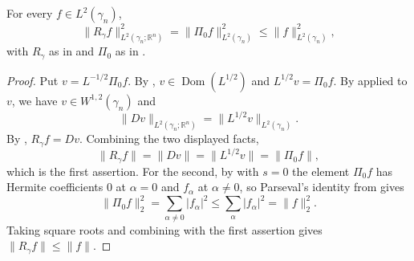 \begin{lemma}
For every $f \in L^2(\gamma_n)$,
\[
  \|R_\gamma f\|_{L^2(\gamma_n;\mathbb{R}^n)}^2 = \|\Pi_0 f\|_{L^2(\gamma_n)}^2
  \leq \|f\|_{L^2(\gamma_n)}^2 ,
\]
with $R_\gamma$ as in  and $\Pi_0$ as in
.
\end{lemma}
\begin{proof}
Put $v = L^{-1/2}\Pi_0 f$.  By ,
$v \in \operatorname{Dom}(L^{1/2})$ and $L^{1/2}v = \Pi_0 f$.  By
 applied to $v$, we have $v \in W^{1,2}(\gamma_n)$ and
\[
  \|Dv\|_{L^2(\gamma_n;\mathbb{R}^n)} = \|L^{1/2}v\|_{L^2(\gamma_n)} .
\]
By , $R_\gamma f = Dv$.  Combining the two displayed
facts,
\[
  \|R_\gamma f\| = \|Dv\| = \|L^{1/2}v\| = \|\Pi_0 f\| ,
\]
which is the first assertion.  For the second, by  with $s = 0$
the element $\Pi_0 f$ has Hermite coefficients $0$ at $\alpha = 0$ and $f_\alpha$
at $\alpha \neq 0$, so Parseval's identity from  gives
\[
  \|\Pi_0 f\|_2^2 = \sum_{\alpha \neq 0}|f_\alpha|^2
    \leq \sum_{\alpha}|f_\alpha|^2 = \|f\|_2^2 .
\]
Taking square roots and combining with the first assertion gives
$\|R_\gamma f\| \leq \|f\|$.
\end{proof}
